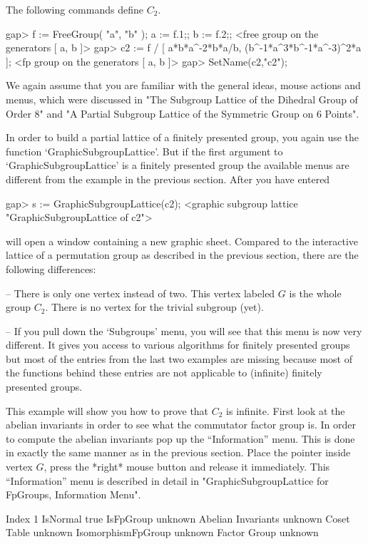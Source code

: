 The following {\GAP} commands define $C_2$.

\begintt
gap> f := FreeGroup( "a", "b" );  a := f.1;;  b := f.2;;
<free group on the generators [ a, b ]>
gap> c2 := f / [ a*b*a^-2*b*a/b, (b^-1*a^3*b^-1*a^-3)^2*a ];
<fp group on the generators [ a, b ]>
gap> SetName(c2,"c2");
\endtt

We again assume that you are familiar with the general ideas, mouse actions
and menus, which were discussed in "The Subgroup Lattice of the Dihedral
Group of Order 8" and "A Partial Subgroup Lattice of the Symmetric Group on
6 Points".

In order  to build a  partial lattice of a  finitely presented group, you
again use the function  `GraphicSubgroup\-Lattice'.  But if the first  argument
to `GraphicSubgroupLattice' is a finitely presented group the available menus
are different  from the example in  the previous section.  After you have
entered

\begintt
gap> s := GraphicSubgroupLattice(c2);
<graphic subgroup lattice "GraphicSubgroupLattice of c2">
\endtt

{\XGAP} will open a window containing a new graphic sheet.  Compared to the
interactive lattice of a permutation group as described in the previous
section, there are the following differences: 

-- There is only one vertex instead of two.  This vertex labeled $G$ is the
whole group $C_2$.  There is no vertex for the trivial subgroup (yet).

-- If you pull down the `Subgroups' menu, you will see  that this menu is
now   very different.   It gives  you   access to various algorithms  for
finitely presented  groups  but most of  the  entries  from the last  two
examples  are missing because most of  the {\GAP}  functions behind these
entries are not applicable to (infinite) finitely presented groups.

This  example will show  you how to prove that  $C_2$ is infinite.  First
look at the abelian invariants in order to see what the commutator factor
group is.   In  order  to  compute the abelian    invariants pop  up  the
``Information'' menu.   This is done in exactly  the same manner  as in the
previous section.  Place the pointer inside vertex $G$, press the *right*
mouse button and release   it  immediately.  This ``Information'' menu   is
described  in   detail in  "GraphicSubgroupLattice  for FpGroups, Information
Menu".

\begintt
Index              1
IsNormal           true
IsFpGroup          unknown
Abelian Invariants unknown
Coset Table        unknown
IsomorphismFpGroup unknown
Factor Group       unknown 
\endtt

